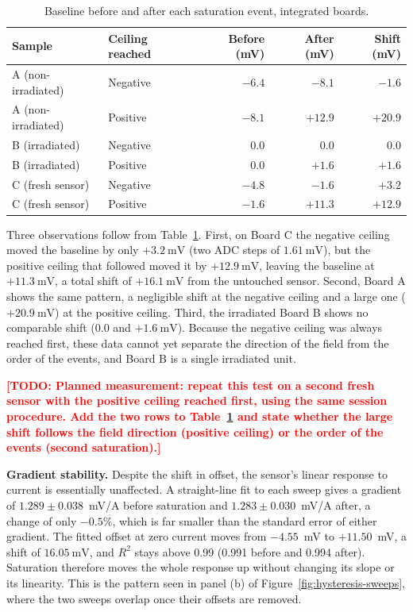 \documentclass[12pt,a4paper]{article}
\newcommand{\todo}[1]{\textcolor{red}{\textbf{[TODO: #1]}}}
\begin{document}
\begin{table}[H]
\centering
\caption{Baseline before and after each saturation event, integrated boards.}
\label{tab:baseline-shift}
\begin{tabular}{@{}llrrr@{}}
\toprule
Sample & Ceiling reached & Before (mV) & After (mV) & Shift (mV) \\
\midrule
A (non-irradiated) & Negative & $-6.4$ & $-8.1$ & $-1.6$ \\
A (non-irradiated) & Positive & $-8.1$ & $+12.9$ & $+20.9$ \\
B (irradiated) & Negative & $0.0$ & $0.0$ & $0.0$ \\
B (irradiated) & Positive & $0.0$ & $+1.6$ & $+1.6$ \\
C (fresh sensor) & Negative & $-4.8$ & $-1.6$ & $+3.2$ \\
C (fresh sensor) & Positive & $-1.6$ & $+11.3$ & $+12.9$ \\
\bottomrule
\end{tabular}
\end{table}

Three observations follow from Table~\ref{tab:baseline-shift}. First, on Board C the negative ceiling moved the baseline by only $+\SI{3.2}{\milli\volt}$ (two ADC steps of $\SI{1.61}{\milli\volt}$), but the positive ceiling that followed moved it by $+\SI{12.9}{\milli\volt}$, leaving the baseline at $+\SI{11.3}{\milli\volt}$, a total shift of $+\SI{16.1}{\milli\volt}$ from the untouched sensor. Second, Board A shows the same pattern, a negligible shift at the negative ceiling and a large one ($+\SI{20.9}{\milli\volt}$) at the positive ceiling. Third, the irradiated Board B shows no comparable shift ($0.0$ and $+\SI{1.6}{\milli\volt}$). Because the negative ceiling was always reached first, these data cannot yet separate the direction of the field from the order of the events, and Board B is a single irradiated unit.

\todo{Planned measurement: repeat this test on a second fresh sensor with the positive ceiling reached first, using the same session procedure. Add the two rows to Table~\ref{tab:baseline-shift} and state whether the large shift follows the field direction (positive ceiling) or the order of the events (second saturation).}

\textbf{Gradient stability.} Despite the shift in offset, the sensor's linear response to current is essentially unaffected. A straight-line fit to each sweep gives a gradient of $1.289 \pm 0.038$~mV/A before saturation and $1.283 \pm 0.030$~mV/A after, a change of only $-0.5\%$, which is far smaller than the standard error of either gradient. The fitted offset at zero current moves from $-4.55$~mV to $+11.50$~mV, a shift of $\SI{16.05}{\milli\volt}$, and $R^2$ stays above 0.99 (0.991 before and 0.994 after). Saturation therefore moves the whole response up without changing its slope or its linearity. This is the pattern seen in panel (b) of Figure~\ref{fig:hysteresis-sweeps}, where the two sweeps overlap once their offsets are removed.
\end{document}
